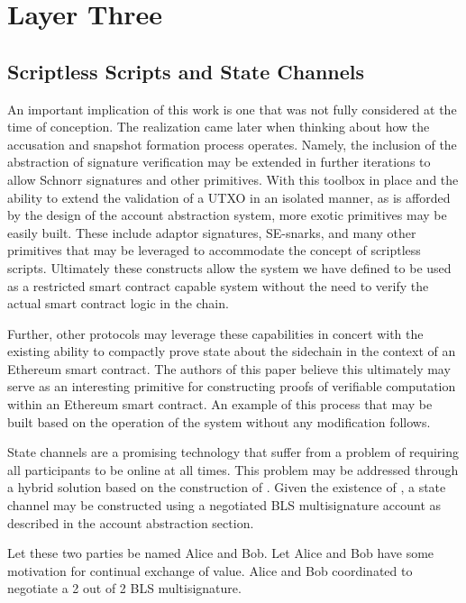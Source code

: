 \section{Layer Three}

\subsection{Scriptless Scripts and State Channels}

An important implication of this work is one that was not fully
considered at the time of conception.
The realization came later when thinking about how the accusation and
snapshot formation process operates.
Namely, the inclusion of the abstraction of signature verification may
be extended in further iterations to allow Schnorr signatures and other
primitives.
With this toolbox in place and the ability to extend the validation of
a UTXO in an isolated manner, as is afforded by the design of the
account abstraction system, more exotic primitives may be easily built.
These include adaptor signatures, SE-snarks, and many other primitives
that may be leveraged to accommodate the concept of scriptless scripts.
Ultimately these constructs allow the system we have defined to be used
as a restricted smart contract capable system without the need to
verify the actual smart contract logic in the chain.

Further, other protocols may leverage these capabilities in concert
with the existing ability to compactly prove state about the sidechain
in the context of an Ethereum smart contract.
The authors of this paper believe this ultimately may serve as an
interesting primitive for constructing proofs of verifiable computation
within an Ethereum smart contract.
An example of this process that may be built based on the operation of
the system without any modification follows.

State channels are a promising technology that suffer from a problem of
requiring all participants to be online at all times.
This problem may be addressed through a hybrid solution based on the
construction of \LayerTwo{}.
Given the existence of \LayerTwo{}, a state channel may be constructed
using a negotiated BLS multisignature account as described in the
account abstraction section.

Let these two parties be named Alice and Bob.
Let Alice and Bob have some motivation for continual exchange of value.
Alice and Bob coordinated to negotiate a 2 out of 2 BLS multisignature.

